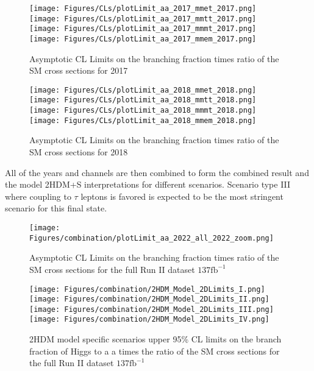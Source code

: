 \begin{figure}[ht!b]
  \centering
  \texttt{[image: Figures/CLs/plotLimit\_aa\_2017\_mmet\_2017.png]}
  \texttt{[image: Figures/CLs/plotLimit\_aa\_2017\_mmtt\_2017.png]}\\
  \texttt{[image: Figures/CLs/plotLimit\_aa\_2017\_mmmt\_2017.png]}
  \texttt{[image: Figures/CLs/plotLimit\_aa\_2017\_mmem\_2017.png]}\\
    \caption{\label{fig:CLs2017} Asymptotic CL Limits on the branching fraction times ratio of the SM cross sections for 2017}
\end{figure}

\begin{figure}[ht!b]
  \centering
  \texttt{[image: Figures/CLs/plotLimit\_aa\_2018\_mmet\_2018.png]}
  \texttt{[image: Figures/CLs/plotLimit\_aa\_2018\_mmtt\_2018.png]}\\
  \texttt{[image: Figures/CLs/plotLimit\_aa\_2018\_mmmt\_2018.png]}
  \texttt{[image: Figures/CLs/plotLimit\_aa\_2018\_mmem\_2018.png]}\\
    \caption{\label{fig:CLs2018} Asymptotic CL Limits on the branching fraction times ratio of the SM cross sections for 2018}
\end{figure}

All of the years and channels are then combined to form the combined result and the model 2HDM+S interpretations for different scenarios. Scenario type III where coupling to $\tau$ leptons is favored is expected to be the most stringent scenario for this final state. 

\begin{figure}[ht!b]
  \texttt{[image: Figures/combination/plotLimit\_aa\_2022\_all\_2022\_zoom.png]}
    \caption{\label{fig:CLsRunII} Asymptotic CL Limits on the branching fraction times ratio of the SM cross sections for the full Run II dataset $\text{137}\text{fb}^{-1}$}
\end{figure}

\begin{figure}[ht!b]
  \centering
  \texttt{[image: Figures/combination/2HDM\_Model\_2DLimits\_I.png]}
  \texttt{[image: Figures/combination/2HDM\_Model\_2DLimits\_II.png]}\\
  \texttt{[image: Figures/combination/2HDM\_Model\_2DLimits\_III.png]}
  \texttt{[image: Figures/combination/2HDM\_Model\_2DLimits\_IV.png]}\\
    \caption{\label{fig:2HDM} 2HDM model specific scenarios upper 95\% CL limits on the branch fraction of Higgs to a a times the ratio of the SM cross sections for the full Run II dataset $\text{137}\text{fb}^{-1}$ }
\end{figure}

